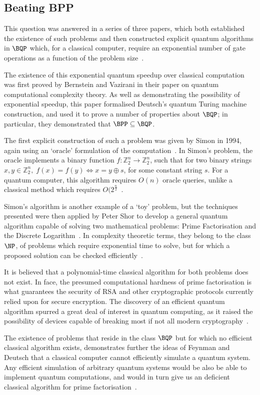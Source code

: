 \documentclass{standalone}
\begin{document}
\subsection{Beating BPP}\label{sec:exponentialspeedup}
This question was answered in a series of three papers, which both established the existence of such problems and then constructed explicit quantum algorithms in $\BQP$ which, for a classical computer, require an exponential number of gate operations as a function of the problem size~\cite{Bennett1997}.
\par
The existence of this exponential quantum speedup over classical computation was first proved by Bernstein and Vazirani in their paper on quantum computational complexity theory. As well as demonstrating the possibility of exponential speedup, this paper formalised Deutsch's quantum Turing machine construction, and used it to prove a number of properties about $\BQP$; in particular, they demonstrated that $\BPP\subseteq\BQP$.
\par
The first explicit construction of such a problem was given by Simon in 1994, again using an `oracle' formulation of the computation~\cite{Division1998a}. In Simon's problem, the oracle implements a binary function $f: \mathbb{Z}_{2}^{n}\rightarrow\mathbb{Z}_{2}^{n}$, such that for two binary strings $x,y\in\mathbb{Z}_{2}^{n},\;f(x)=f(y)\Leftrightarrow x = y \oplus s$, for some constant string $s$. For a quantum computer, this algorithm requires $O(n)$ oracle queries, unlike a classical method which requires $O(2^{\frac{n}{2}}$~\cite{Division1998a}.
\par
Simon's algorithm is another example of a `toy' problem, but the techniques presented were then applied by Peter Shor to develop a general quantum algorithm capable of solving two mathematical problems: Prime Factorisation and the Discrete Logarithm~\cite{Division1998a,Shor1997}. In complexity theoretic terms, they belong to the class $\NP$, of problems which require exponential time to solve, but for which a proposed solution can be checked efficiently~\cite{Bennett1997}.
\par
It is believed that a polynomial-time classical algorithm for both problems does not exist. In face, the presumed computational hardness of prime factorisation is what guarantees the security of RSA and other cryptographic protocols currently relied upon for secure encryption. The discovery of an efficient quantum algorithm spurred a great deal of interest in quantum computing, as it raised the possibility of devices capable of breaking most if not all modern cryptography~\cite{Shor1997}. 
\par
The existence of problems that reside in the class $\BQP$ but for which no efficient classical algorithm exists, demonstrates further the ideas of Feynman and Deutsch that a classical computer cannot efficiently simulate a quantum system. Any efficient simulation of arbitrary quantum systems would be also be able to implement quantum computations, and would in turn give us an deficient classical algorithm for prime factorisation~\cite{Shor1997}.
\par
\end{document}

